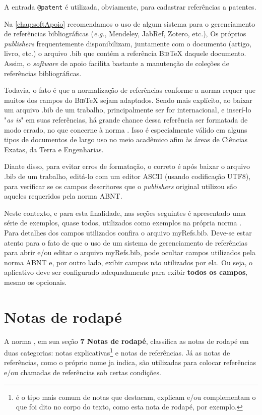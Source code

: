 \begin{apendicesenv}
A entrada \verb|@patent| é utilizada, obviamente, para cadastrar referências a patentes.

Na \autoref{chap:softApoio} recomendamos o uso de algum sistema para o gerenciamento de referências bibliográficas (\textit{e.g.}, Mendeley, JabRef, Zotero, etc.), Os próprios \textit{publishers} frequentemente disponibilizam, juntamente com o documento (artigo, livro, etc.) o arquivo {\ttfamily .bib} que contém a referência  \textsc{Bib}\TeX{} daquele documento. Assim, o \textit{software} de apoio facilita bastante a manutenção de coleções de referências bibliográficas.

Todavia, o fato é que a normalização de referências conforme a norma  requer que muitos dos campos do \textsc{Bib}\TeX{} sejam adaptados. Sendo mais explícito, ao baixar um arquivo {\ttfamily .bib} de um trabalho, principalmente ser for internacional, e inserí-lo "\textit{as is}"{} em suas referências, há grande chance dessa referência ser formatada de modo errado, no que concerne à norma . Isso é especialmente válido em alguns tipos de documentos de largo uso no meio acadêmico afim às áreas de Ciências Exatas, da Terra e Engenharias.

Diante disso, para evitar erros de formatação, o correto é após baixar o arquivo {\ttfamily .bib} de um trabalho, editá-lo com um editor ASCII (usando codificação UTF8), para verificar se os campos descritores que o \textit{publishers} original utilizou são aqueles requeridos pela norma ABNT.

Neste contexto, e para esta finalidade, nas seções seguintes é apresentado uma série de exemplos, quase todos, utilizados como exemplos na própria norma . Para detalhes dos campos utilizados confira o arquivo {\ttfamily myRefs.bib}. Deve-se estar atento para o fato de que o uso de um sistema de gerenciamento de referências para abrir e/ou editar o arquivo {\ttfamily myRefs.bib}, pode ocultar campos utilizados pela norma ABNT e, por outro lado, exibir campos não utilizados por ela. Ou seja, o aplicativo deve ser configurado adequadamente para exibir \textbf{todos os campos}, mesmo os opcionais.



\section{Notas de rodapé}
\label{sec:notasRodape}


A norma , em sua seção \textbf{7 Notas de rodapé}, classifica as notas de rodapé em duas categorias: notas explicativas\footnote{é o tipo mais comum de notas que destacam, explicam e/ou complementam o que foi dito no corpo do texto, como esta nota de rodapé, por exemplo.} e notas de referências. Já as notas de referências, como o próprio nome ja indica, são utilizadas para colocar referências e/ou chamadas de referências sob certas condições.




\end{apendicesenv}
